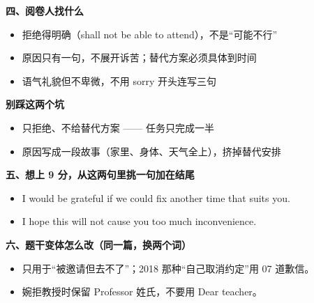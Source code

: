\documentclass[11pt,a4paper]{ctexart}
\begin{document}
\vspace{5pt}
\noindent\begin{minipage}[t]{0.555\linewidth}
{\color{accent}\bfseries 四、阅卷人找什么}\par
{\footnotesize\begin{itemize}[leftmargin=1.2em,itemsep=1pt,topsep=1pt,parsep=0pt]\setlength{\leftmargin}{1.1em}
\item 拒绝得明确（shall not be able to attend），不是“可能不行”
\item 原因只有一句，不展开诉苦；替代方案必须具体到时间
\item 语气礼貌但不卑微，不用 sorry 开头连写三句
\end{itemize}}
\end{minipage}\hfill
\begin{minipage}[t]{0.415\linewidth}
{\color{hot}\bfseries 别踩这两个坑}\par
{\footnotesize\begin{itemize}[leftmargin=1.2em,itemsep=1pt,topsep=1pt,parsep=0pt]\setlength{\leftmargin}{1.1em}
\item 只拒绝、不给替代方案 —— 任务只完成一半
\item 原因写成一段故事（家里、身体、天气全上），挤掉替代安排
\end{itemize}}
\end{minipage}\par

\vspace{6pt}
{\color{accent}\bfseries 五、想上 9 分，从这两句里挑一句加在结尾}\par
\vspace{2pt}
{\footnotesize
\begin{itemize}[leftmargin=1.2em,itemsep=1.5pt,topsep=1pt,parsep=0pt]
\item I would be grateful if we could fix another time that suits you.
\item I hope this will not cause you too much inconvenience.
\end{itemize}}\par

\vspace{6pt}
{\color{accent}\bfseries 六、题干变体怎么改（同一篇，换两个词）}\par
\vspace{2pt}
{\footnotesize
\begin{itemize}[leftmargin=1.2em,itemsep=1.5pt,topsep=1pt,parsep=0pt]
\item 只用于“被邀请但去不了”；2018 那种“自己取消约定”用 07 道歉信。
\item 婉拒教授时保留 Professor 姓氏，不要用 Dear teacher。
\end{itemize}}\par
\end{document}
